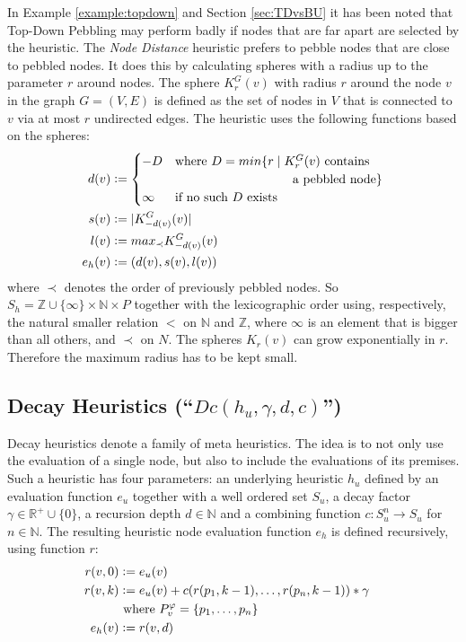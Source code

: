 In Example \ref{example:topdown} and Section \ref{sec:TDvsBU} it has been noted that Top-Down Pebbling may perform badly if nodes that are far apart are selected by the heuristic.
The \emph{Node Distance} heuristic prefers to pebble nodes that are close to pebbled nodes. It does this by calculating spheres with a radius up to the parameter $r$ around nodes.
The sphere $K_r^{G}(v)$ with radius $r$ around the node $v$ in the graph $G = (V,E)$ is defined as the set 
of nodes in $V$ that is connected to $v$ via at most $r$ undirected edges.
The heuristic uses the following functions based on the spheres:
\begin{align*}
	d(v) &\defeq 
	\begin{cases}
		-D &\text{where } D = min\{r \mid K_r^{G}(v)  \text{ contains}\\
			 & \hspace{3.3cm}  \text{a pebbled node}\}\\
		\infty & \text{if no such } D \text{ exists} 
	\end{cases}\\
	s(v) &\defeq |K_{-d(v)}^G(v)|\\
	l(v) &\defeq max_{\prec}K_{-d(v)}^G(v)\\
	e_h(v) &\defeq (d(v),s(v),l(v))
\end{align*}
where $\prec$ denotes the order of previously pebbled nodes.
So $S_h = \mathbb{Z} \cup \{\infty\} \times \mathbb{N} \times P$ together with the lexicographic order using, respectively, the natural smaller relation $<$ on $\mathbb{N}$ and $\mathbb{Z}$, where $\infty$ is an element that is bigger than all others, and $\prec$ on $N$. The spheres $K_r(v)$ can grow exponentially in $r$. Therefore the maximum radius has to be kept small.

\subsection{Decay Heuristics (``$Dc(h_u,\gamma,d,c)$'') }
\label{sec:decay}
Decay heuristics denote a family of meta heuristics. 
The idea is to not only use the evaluation of a single node, but also to include the evaluations of its premises.
Such a heuristic has four parameters: an underlying heuristic $h_u$ defined by an evaluation function $e_u$ together with a well ordered set $S_u$, a decay factor $\gamma \in \mathbb{R}^+ \cup \{0\}$, a recursion depth $d \in \mathbb{N}$ and a combining function $c: S_u^n \rightarrow S_u$ for $n \in \mathbb{N}$.
The resulting heuristic node evaluation function $e_h$ is defined recursively, using function $r$:
\begin{align*}
	r(v,0) &\mathrel{\mathop:}= e_u(v) \\
	r(v,k) &\mathrel{\mathop:}= e_u(v) + c(r(p_1,k-1), \ldots,r(p_n,k-1)) * \gamma\\
	& \text{ where } P_{v}^{\varphi} = \{p_1,\ldots,p_n\}\\
	e_h(v) &\mathrel{\mathop:}= r(v,d) &
\end{align*}


